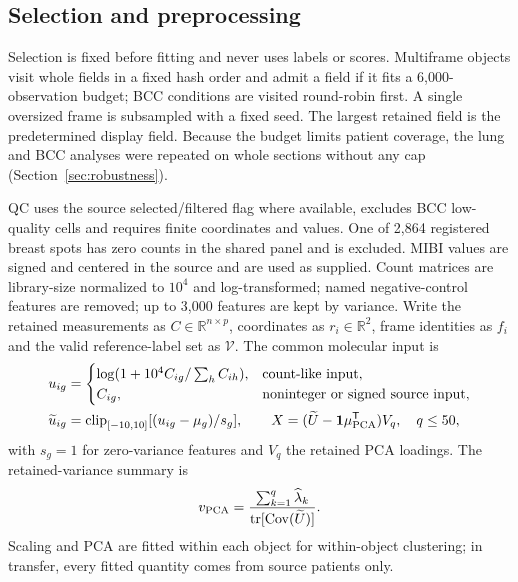 \documentclass[11pt]{article}
\begin{document}
\subsection{Selection and preprocessing}
Selection is fixed before fitting and never uses labels or scores. Multiframe objects visit whole fields in a fixed hash order and admit a field if it fits a 6,000-observation budget; BCC conditions are visited round-robin first. A single oversized frame is subsampled with a fixed seed. The largest retained field is the predetermined display field. Because the budget limits patient coverage, the lung and BCC analyses were repeated on whole sections without any cap (Section~\ref{sec:robustness}).

QC uses the source selected/filtered flag where available, excludes BCC low-quality cells and requires finite coordinates and values. One of 2,864 registered breast spots has zero counts in the shared panel and is excluded. MIBI values are signed and centered in the source and are used as supplied. Count matrices are library-size normalized to \(10^4\) and log-transformed; named negative-control features are removed; up to 3,000 features are kept by variance. Write the retained measurements as \(C\in\mathbb{R}^{n\times p}\), coordinates as \(r_i\in\mathbb{R}^2\), frame identities as \(f_i\) and the valid reference-label set as \(\mathcal V\). The common molecular input is
\begin{align}
u_{ig}&=\begin{cases}\log(1+10^4 C_{ig}/\sum_h C_{ih}),&\text{count-like input},\\ C_{ig},&\text{noninteger or signed source input},\end{cases}\label{eq:normalization}\\
\widetilde u_{ig}&=\operatorname{clip}_{[-10,10]}[(u_{ig}-\mu_g)/s_g],\qquad
X=(\widetilde U-\mathbf{1}\mu_{\rm PCA}^{\mathsf T})V_q,\quad q\leq50,\label{eq:pca}
\end{align}
with \(s_g=1\) for zero-variance features and \(V_q\) the retained PCA loadings. The retained-variance summary is
\begin{equation}
v_{\rm PCA}=\frac{\sum_{k=1}^{q}\widehat\lambda_k}{\operatorname{tr}[\operatorname{Cov}(\widetilde U)]}.\label{eq:variance}
\end{equation}
Scaling and PCA are fitted within each object for within-object clustering; in transfer, every fitted quantity comes from source patients only.
\end{document}
